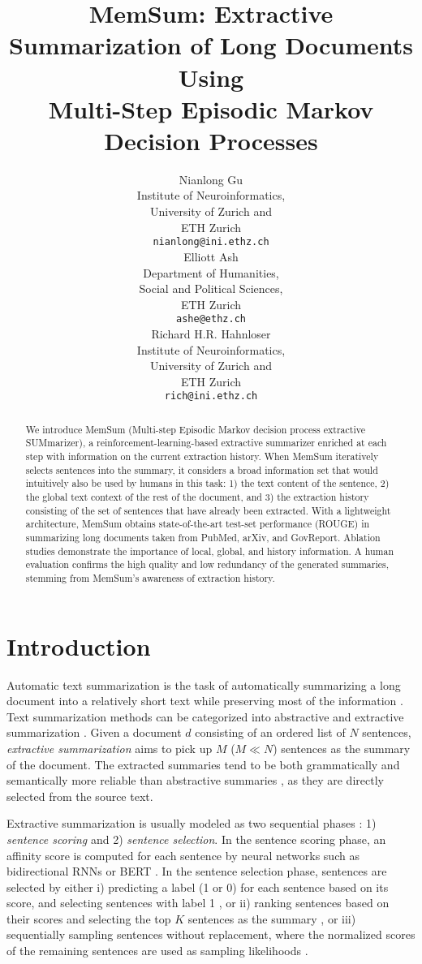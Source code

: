 \documentclass[11pt]{article}
\title{MemSum: Extractive Summarization of Long Documents Using \\ Multi-Step Episodic Markov Decision Processes}
\author{Nianlong Gu \\
  Institute of Neuroinformatics,\\ 
  University of Zurich and\\
  ETH Zurich\\
  \texttt{nianlong@ini.ethz.ch} \\\And
  Elliott Ash \\
  Department of Humanities,\\
  Social and Political Sciences, \\
  ETH Zurich \\
  \texttt{ashe@ethz.ch} \\ \And
  Richard H.R. Hahnloser\\
  Institute of Neuroinformatics,\\
  University of Zurich and\\
  ETH Zurich\\
  \texttt{rich@ini.ethz.ch}\\
  }
\begin{document}
\maketitle
\begin{abstract}
We introduce MemSum (Multi-step Episodic Markov decision process extractive SUMmarizer), a reinforcement-learning-based extractive summarizer enriched at each step with information on the current extraction history. When MemSum iteratively selects sentences into the summary, it considers a broad information set that would intuitively also be used by humans in this task: 1) the text content of the sentence, 2) the global text context of the rest of the document, and 3) the extraction history consisting of the set of sentences that have already been extracted. With a lightweight architecture, MemSum obtains state-of-the-art test-set performance (ROUGE) in summarizing long documents taken from PubMed, arXiv, and GovReport. Ablation studies demonstrate the importance of local, global, and history information. A human evaluation confirms the high quality and low redundancy of the generated summaries, stemming from MemSum's awareness of extraction history.
\end{abstract}

\section{Introduction}

Automatic text summarization is the task of automatically summarizing a long document into a relatively short text while preserving most of the information \cite{tas2007survey}. Text summarization methods can be categorized into abstractive and extractive summarization \cite{10.1007/s10462-016-9475-9,nenkova_survey_2012}. Given a document $d$ consisting of an ordered list of $N$ sentences, \textit{extractive summarization} aims to pick up $M$ ($M$$\ll$$N$) sentences as the summary of the document. The extracted summaries tend to be both grammatically and semantically more reliable than abstractive summaries \cite{liu2018generating, liu2019hierarchical, luo2019reading,liao2020improving}, as they are directly selected from the source text.

Extractive summarization is usually modeled as two sequential phases \cite{zhou-etal-2018-neural-document}: 1) \textit{sentence scoring} and 2) \textit{sentence selection}. In the sentence scoring phase, an affinity score is computed for each sentence by neural networks such as bidirectional RNNs \cite{dong2018banditsum,narayan2018ranking,luo2019reading,xiao-carenini-2019-extractive} or BERT \cite{zhang2019hibert,liu2019text}. In the sentence selection phase, sentences are selected by either i) predicting a label (1 or 0) for each sentence based on its score, and selecting sentences with label 1 \cite{zhang2019hibert,liu2019text,xiao-carenini-2019-extractive}, or ii) ranking sentences based on their scores and selecting the top $K$ sentences as the summary \cite{narayan2018ranking}, or iii) sequentially sampling sentences without replacement, where the normalized scores of the remaining sentences are used as sampling likelihoods \cite{dong2018banditsum,luo2019reading}.
\end{document}
